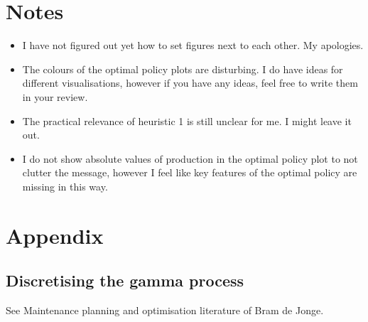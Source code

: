 \documentclass[a4paper,12pt]{article}
\begin{document}
\section{Notes}
\begin{itemize}
	\item I have not figured out yet how to set figures next to each other. My apologies. 
	\item The colours of the optimal policy plots are disturbing. I do have ideas for different visualisations, however if you have any ideas, feel free to write them in your review.
	\item The practical relevance of heuristic 1 is still unclear for me. I might leave it out.
	\item I do not show absolute values of production in the optimal policy plot to not clutter the message, however I feel like key features of the optimal policy are missing in this way.
\end{itemize}


 


\appendix

\section{Appendix}

\subsection{Discretising the gamma process}
See Maintenance planning and optimisation literature of Bram de Jonge.
\end{document}
